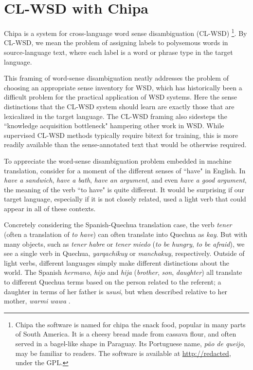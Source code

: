\documentclass[10pt, a4paper]{article}
\begin{document}
\section{CL-WSD with Chipa}
Chipa is a system for cross-language word sense disambiguation (CL-WSD)
\footnote{Chipa the software is named for chipa the snack food, popular in many
parts of South America. It is a cheesy bread made from cassava flour, and
often served in a bagel-like shape in Paraguay. Its Portuguese name,
\emph{p\~{a}o de queijo}, may be familiar to readers. The software is available
at \url{http://redacted}, under the GPL.}. By
CL-WSD, we mean the problem of assigning labels to polysemous words in
source-language text, where each label is a word or phrase type in the target
language.

This framing of word-sense disambiguation neatly addresses the problem of
choosing an appropriate sense inventory for WSD, which has historically been a
difficult problem for the practical application of WSD systems.
Here the sense distinctions that the CL-WSD system should learn are exactly
those that are lexicalized in the target language.
The CL-WSD framing also sidesteps the ``knowledge
acquisition bottleneck" \cite{agirre2006word}
hampering other work in WSD. While supervised CL-WSD methods typically require
bitext for training, this is more readily available than the sense-annotated
text that would be otherwise required.

To appreciate the word-sense disambiguation problem embedded in machine
translation, consider for a moment of the different senses of ``have" in
English. In \emph{have a sandwich}, \emph{have a bath}, \emph{have an
argument}, and even \emph{have a good argument}, the meaning of the verb ``to
have" is quite different. It would be surprising if our target language,
especially if it is not closely related, used a light verb that could appear in
all of these contexts.

Concretely considering the Spanish-Quechua translation case, the verb
\emph{tener} (often a translation of \emph{to have}) can often translate into
Quechua as \emph{kay}. But with many objects, such as \emph{tener habre} or
\emph{tener miedo} (\emph{to be hungry}, \emph{to be afraid}), we see a single
verb in Quechua, \emph{yarqachikuy} or \emph{manchakuy}, respectively.  Outside
of light verbs, different languages simply make different distinctions about
the world. The Spanish \emph{hermano}, \emph{hijo} and \emph{hija}
(\emph{brother}, \emph{son}, \emph{daughter}) all translate to different
Quechua terms based on the person related to the referent; a daughter in terms
of her father is \emph{ususi}, but when described relative to her mother,
\emph{warmi wawa} \cite{academiamayor}.
\end{document}
